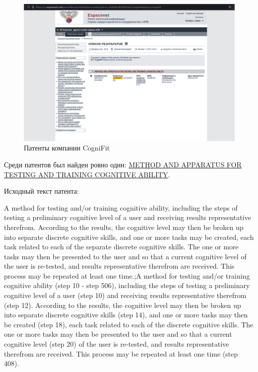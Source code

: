 \documentclass[12pt]{article}
\begin{document}
    \begin{figure}[ht]
        \centering
        \includegraphics[scale=1.5]{images/1.png}
        \caption{Патенты компании CogniFit}
        \label{fig:o:1}
    \end{figure}

    Среди патентов был найден ровно один: \href{https://ru.espacenet.com/publicationDetails/biblio?FT=D&date=20110218&DB=EPODOC&locale=ru_RU&CC=ES&NR=2352415T3&KC=T3&ND=5}{METHOD AND APPARATUS FOR TESTING AND TRAINING COGNITIVE ABILITY}.

    Исходный текст патента:

    A method for testing and/or training cognitive ability, including the steps of testing a preliminary cognitive level of a user and receiving results representative therefrom.
    According to the results, the cognitive level may then be broken up into separate discrete cognitive skills, and one or more tasks may be created, each task related to each of the separate discrete cognitive skills.
    The one or more tasks may then be presented to the user and so that a current cognitive level of the user is re-tested, and results representative therefrom are received.
    This process may be repeated at least one time.;A method for testing and/or training cognitive ability (step 10 - step 506), including the steps of testing a preliminary cognitive level of a user (step 10) and receiving results representative therefrom (step 12).
    According to the results, the cognitive level may then be broken up into separate discrete cognitive skills (step 14), and one or more tasks may then be created (step 18), each task related to each of the discrete cognitive skills.
    The one or more tasks may then be presented to the user and so that a current cognitive level (step 20) of the user is re-tested, and results representative therefrom are received.
    This process may be repeated at least one time (step 408).
\end{document}
